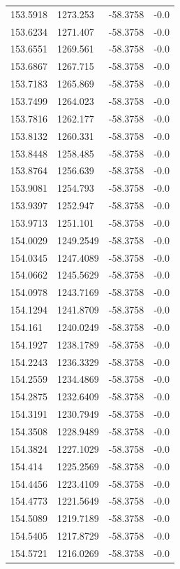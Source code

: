 \begin{table}[H]
\begin{tabular}{llll}
153.5918 & 1273.253 & -58.3758 & -0.0 \\
153.6234 & 1271.407 & -58.3758 & -0.0 \\
153.6551 & 1269.561 & -58.3758 & -0.0 \\
153.6867 & 1267.715 & -58.3758 & -0.0 \\
153.7183 & 1265.869 & -58.3758 & -0.0 \\
153.7499 & 1264.023 & -58.3758 & -0.0 \\
153.7816 & 1262.177 & -58.3758 & -0.0 \\
153.8132 & 1260.331 & -58.3758 & -0.0 \\
153.8448 & 1258.485 & -58.3758 & -0.0 \\
153.8764 & 1256.639 & -58.3758 & -0.0 \\
153.9081 & 1254.793 & -58.3758 & -0.0 \\
153.9397 & 1252.947 & -58.3758 & -0.0 \\
153.9713 & 1251.101 & -58.3758 & -0.0 \\
154.0029 & 1249.2549 & -58.3758 & -0.0 \\
154.0345 & 1247.4089 & -58.3758 & -0.0 \\
154.0662 & 1245.5629 & -58.3758 & -0.0 \\
154.0978 & 1243.7169 & -58.3758 & -0.0 \\
154.1294 & 1241.8709 & -58.3758 & -0.0 \\
154.161 & 1240.0249 & -58.3758 & -0.0 \\
154.1927 & 1238.1789 & -58.3758 & -0.0 \\
154.2243 & 1236.3329 & -58.3758 & -0.0 \\
154.2559 & 1234.4869 & -58.3758 & -0.0 \\
154.2875 & 1232.6409 & -58.3758 & -0.0 \\
154.3191 & 1230.7949 & -58.3758 & -0.0 \\
154.3508 & 1228.9489 & -58.3758 & -0.0 \\
154.3824 & 1227.1029 & -58.3758 & -0.0 \\
154.414 & 1225.2569 & -58.3758 & -0.0 \\
154.4456 & 1223.4109 & -58.3758 & -0.0 \\
154.4773 & 1221.5649 & -58.3758 & -0.0 \\
154.5089 & 1219.7189 & -58.3758 & -0.0 \\
154.5405 & 1217.8729 & -58.3758 & -0.0 \\
154.5721 & 1216.0269 & -58.3758 & -0.0 \\

\end{tabular}
\end{table}
